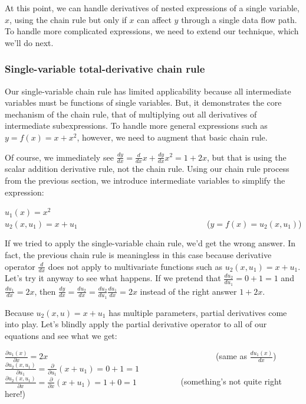 \documentclass[11pt]{article}
\begin{document}
At this point, we can handle derivatives of nested expressions of a single variable, $x$, using the chain rule but only if $x$ can affect $y$ through a single data flow path. To handle more complicated expressions, we need to extend our technique, which we'll do next.

\subsubsection{Single-variable total-derivative chain rule}

Our single-variable chain rule has limited applicability because all intermediate variables must be functions of single variables. But, it demonstrates the core mechanism of the chain rule, that of multiplying out all derivatives of intermediate subexpressions. To handle more general expressions such as $y = f(x) = x+x^2$, however, we need to augment that basic chain rule.

Of course, we immediately see $\frac{dy}{dx} = \frac{d}{dx}x + \frac{dy}{dx}x^2 = 1 + 2x$, but that is using the scalar  addition derivative rule, not the chain rule.  Using our chain rule process from the previous section, we introduce intermediate variables to simplify the expression:

$u_1(x) = x^2$\\
$u_2(x,u_1) = x + u_1$ ~~~~~~~~~~~~~~~~~~~~~~~~~~~~~~ ($y = f(x) = u_2(x,u_1)$)

If we tried to apply the single-variable chain rule, we'd get the wrong answer. In fact, the previous chain rule is meaningless in this case because derivative operator $\frac{d}{dx}$ does not apply to multivariate functions such as $u_2(x,u_1) = x + u_1$. Let's try it anyway to see what happens. If we pretend that $\frac{du_2}{du_1} = 0 + 1 = 1$ and $\frac{du_1}{dx} = 2x$, then $\frac{dy}{dx} = \frac{du_2}{dx} = \frac{du_2}{du_1} \frac{du_1}{dx} = 2x$ instead of the right answer $1 + 2x$.  

Because $u_2(x,u) = x + u_1$ has multiple parameters, partial derivatives come into play. Let's blindly apply the partial derivative operator to all of our equations and see what we get:

$\frac{\partial u_1(x)}{\partial x} = 2x$ ~~~~~~~~~~~~~~~~~~~~~~~~~~~~~~~~~~~~~~~~(same as $\frac{du_1(x)}{dx}$)\\
$\frac{\partial u_2(x,u_1)}{\partial u_1} = \frac{\partial }{\partial u_1}(x + u_1) = 0 + 1 = 1$\\
$\frac{\partial u_2(x,u_1)}{\partial x} = \frac{\partial }{\partial x}(x + u_1) = 1 + 0 = 1$ ~~~~~~~~~~(something's not quite right here!)\\
\end{document}
